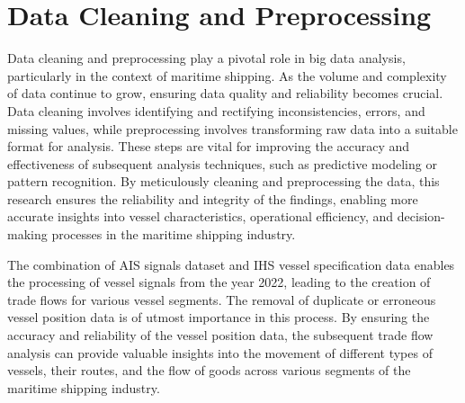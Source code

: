 \chapter{Data Cleaning and Preprocessing}

Data cleaning and preprocessing play a pivotal role in big data analysis, particularly in the context of maritime shipping.
As the volume and complexity of data continue to grow, ensuring data quality and reliability becomes crucial. Data cleaning involves identifying and rectifying inconsistencies, errors, and missing values, while preprocessing involves transforming raw data into a suitable format for analysis.
These steps are vital for improving the accuracy and effectiveness of subsequent analysis techniques, such as predictive modeling or pattern recognition. By meticulously cleaning and preprocessing the data, this research ensures the reliability and integrity of the findings, enabling more accurate insights into vessel characteristics, operational efficiency, and decision-making processes in the maritime shipping industry.

The combination of AIS signals dataset and IHS vessel specification data enables the processing of vessel signals from the year 2022, leading to the creation of trade flows for various vessel segments.
The removal of duplicate or erroneous vessel position data is of utmost importance in this process.
By ensuring the accuracy and reliability of the vessel position data,
the subsequent trade flow analysis can provide valuable insights into the movement of different types of vessels, their routes, and the flow of goods across various segments of the maritime shipping industry.


